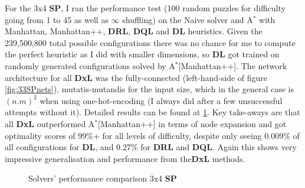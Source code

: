 
For the 3x4 \textbf{SP}, I ran the performance test (100 random puzzles for difficulty going from 1 to 45 as well as $\infty$ shuffling) on the Naive solver and A$^{*}$ with Manhattan, Manhattan++, \textbf{DRL}, \textbf{DQL} and \textbf{DL} heuristics. Given the 239,500,800 total possible configurations there was no chance for me to compute the perfect heuristic as I did with smaller dimensions, so \textbf{DL} got trained on randomly generated configurations solved by A$^{*}$[Manhattan++]. The network architecture for all \textbf{DxL} was the fully-connected (left-hand-side of figure \ref{fig:33SPnets}), mutatis-mutandis for the input size, which in the general case is $(n.m)^{2}$ when using one-hot-encoding (I always did after a few unsuccessful attempts without it). Detailed results can be found at \ref{fig:34SPPerformance}. Key take-aways are that all \textbf{DxL} outperformed A$^{*}$[Manhattan++] in terms of node expansion and got optimality scores of 99\%+ for all levels of difficulty, despite only seeing 0.009\% of all configurations for \textbf{DL}, and 0.27\% for \textbf{DRL} and \textbf{DQL}. Again this shows very impressive generalisation and performance from the\textbf{DxL} methods.

\label{ssec:34SPSC}

\begin{figure}[H]
  \noindent
  \caption[34SPPerformance]{Solvers' performance comparison 3x4 \textbf{SP}}
   \label{fig:34SPPerformance}
\end{figure}





